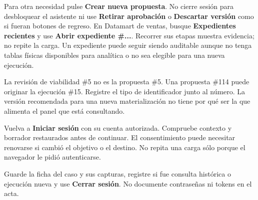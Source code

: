 Para otra necesidad pulse \textbf{Crear nueva propuesta}. No cierre sesión para desbloquear el asistente ni use \textbf{Retirar aprobación} o \textbf{Descartar versión} como si fueran botones de regreso.
En Datamart de ventas, busque \textbf{Expedientes recientes} y use \textbf{Abrir expediente \#...}. Recorrer sus etapas muestra evidencia; no repite la carga. Un expediente puede seguir siendo auditable aunque no tenga tablas físicas disponibles para analítica o no sea elegible para una nueva ejecución.
\begin{note}
La revisión de viabilidad \#5 no es la propuesta \#5. Una propuesta \#114 puede originar la ejecución \#15. Registre el tipo de identificador junto al número. La versión recomendada para una nueva materialización no tiene por qué ser la que alimenta el panel que está consultando.
\end{note}
Vuelva a \textbf{Iniciar sesión} con su cuenta autorizada. Compruebe contexto y borrador restaurados antes de continuar. El consentimiento puede necesitar renovarse si cambió el objetivo o el destino. No repita una carga sólo porque el navegador le pidió autenticarse.
\begin{good}
Guarde la ficha del caso y sus capturas, registre si fue consulta histórica o ejecución nueva y use \textbf{Cerrar sesión}. No documente contraseñas ni tokens en el acta.
\end{good}
